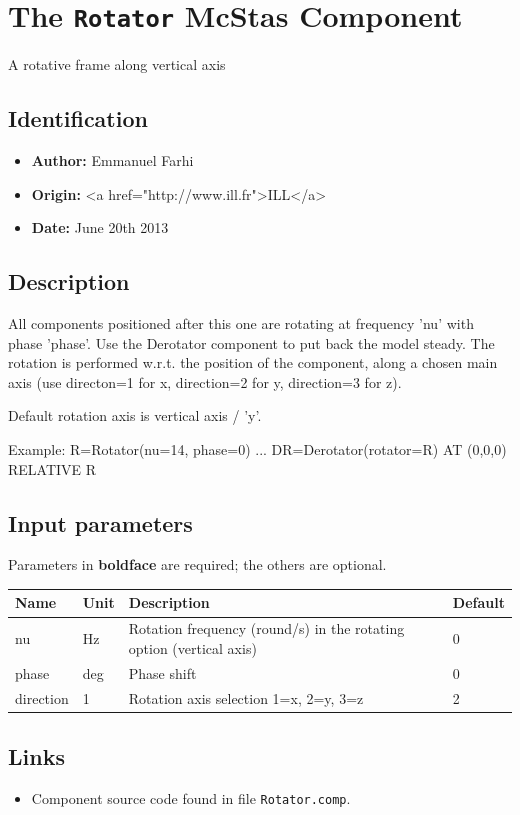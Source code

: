 \section{The \texttt{Rotator} McStas Component}
A rotative frame along vertical axis

\subsection*{Identification}
\begin{itemize}
  \item \textbf{Author:} Emmanuel Farhi
  \item \textbf{Origin:} \textless{}a href="http://www.ill.fr"\textgreater{}ILL\textless{}/a\textgreater{}
  \item \textbf{Date:} June 20th 2013
\end{itemize}

\subsection*{Description}
All components positioned after this one are rotating at frequency 'nu' with phase 'phase'. Use the Derotator component to put back the model steady. The rotation is performed w.r.t. the position of the component, along a chosen main axis (use directon=1 for x, direction=2 for y, direction=3 for z).

Default rotation axis is vertical axis / 'y'.

Example: R=Rotator(nu=14, phase=0) ... DR=Derotator(rotator=R) AT (0,0,0) RELATIVE R

\subsection*{Input parameters}
Parameters in \textbf{boldface} are required; the others are optional.

\begin{longtable}{p{}p{}p{}p{}}
\toprule
\textbf{Name} & \textbf{Unit} & \textbf{Description} & \textbf{Default} \\
\midrule
\endhead
nu & Hz & Rotation frequency (round/s) in the rotating option (vertical axis) & 0 \\
phase & deg & Phase shift & 0 \\
direction & 1 & Rotation axis selection 1=x, 2=y, 3=z & 2 \\
\bottomrule
\end{longtable}

\subsection*{Links}
\begin{itemize}
  \item Component source code found in file \texttt{Rotator.comp}.
\end{itemize}
